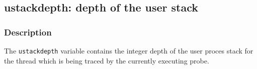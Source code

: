 \clearpage
{}
{}
\label{vars:ustackdepth}
\subsection*{ustackdepth: depth of the user stack}

\subsubsection*{Description}

The \verb|ustackdepth| variable contains the integer depth of the user
proces stack for the thread which is being traced by the currently
executing probe.

